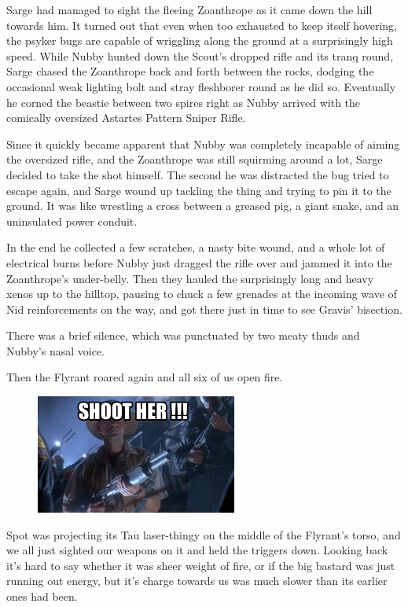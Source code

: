 Sarge had managed to sight the fleeing Zoanthrope as it came down the hill towards him. 
It turned out that even when too exhausted to keep itself hovering, the psyker bugs are capable of wriggling along the ground at a surprisingly high speed. 
While Nubby hunted down the Scout's dropped rifle and its tranq round, Sarge chased the Zoanthrope back and forth between the rocks, dodging the occasional weak lighting bolt and stray fleshborer round as he did so. 
Eventually he corned the beastie between two spires right as Nubby arrived with the comically oversized Astartes Pattern Sniper Rifle.

Since it quickly became apparent that Nubby was completely incapable of aiming the oversized rifle, and the Zoanthrope was still squirming around a lot, Sarge decided to take the shot himself. 
The second he was distracted the bug tried to escape again, and Sarge wound up tackling the thing and trying to pin it to the ground. 
It was like wrestling a cross between a greased pig, a giant snake, and an uninsulated power conduit. 


In the end he collected a few scratches, a nasty bite wound, and a whole lot of electrical burns before Nubby just dragged the rifle over and jammed it into the Zoanthrope's under-belly. 
Then they hauled the surprisingly long and heavy xenos up to the hilltop, pausing to chuck a few grenades at the incoming wave of Nid reinforcements on the way, and got there just in time to see Gravis' bisection.

There was a brief silence, which was punctuated by two meaty thuds and Nubby's nasal voice.



Then the Flyrant roared again and all six of us open fire.
\begin{figure}
	\begin{center}
		\includegraphics[width=\figwidth]{pics/12/52.png}
	\end{center}
\end{figure}
Spot was projecting its Tau laser-thingy on the middle of the Flyrant's torso, and we all just sighted our weapons on it and held the triggers down. 
Looking back it's hard to say whether it was sheer weight of fire, or if the big bastard was just running out energy, but it's charge towards us was much slower than its earlier ones had been.

